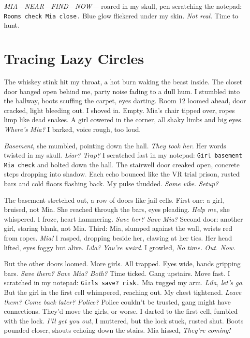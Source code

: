 \documentclass[12pt,oneside]{book}
\newcommand{\note}[1]{\texttt{#1}}
\begin{document}
\textit{MIA—NEAR—FIND—NOW—} roared in my skull, pen scratching the notepad: \note{Rooms check Mia close.} Blue glow flickered under my skin. \textit{Not real.} Time to hunt.

\chapter{Tracing Lazy Circles}

The whiskey stink hit my throat, a hot burn waking the beast inside. The closet door banged open behind me, party noise fading to a dull hum. I stumbled into the hallway, boots scuffing the carpet, eyes darting. Room 12 loomed ahead, door cracked, light bleeding out. I shoved in. Empty. Mia’s chair tipped over, ropes limp like dead snakes. A girl cowered in the corner, all shaky limbs and big eyes. \textit{Where’s Mia?} I barked, voice rough, too loud.

\textit{Basement}, she mumbled, pointing down the hall. \textit{They took her}. Her words twisted in my skull. \textit{Liar? Trap?} I scratched fast in my notepad: \note{Girl basement Mia check} and bolted down the hall. The stairwell door creaked open, concrete steps dropping into shadow. Each echo bounced like the VR trial prison, rusted bars and cold floors flashing back. My pulse thudded. \textit{Same vibe. Setup?}

The basement stretched out, a row of doors like jail cells. First one: a girl, bruised, not Mia. She reached through the bars, eyes pleading. \textit{Help me}, she whispered. I froze, heart hammering. \textit{Save her? Save Mia?} Second door: another girl, staring blank, not Mia. Third: Mia, slumped against the wall, wrists red from ropes. \textit{Mia!} I rasped, dropping beside her, clawing at her ties. Her head lifted, eyes foggy but alive. \textit{Lila? You’re weird}. I growled, \textit{No time. Out. Now.}

But the other doors loomed. More girls. All trapped. Eyes wide, hands gripping bars. \textit{Save them? Save Mia? Both?} Time ticked. Gang upstairs. Move fast. I scratched in my notepad: \note{Girls save? risk.} Mia tugged my arm. \textit{Lila, let’s go}. But the girl in the first cell whimpered, reaching out. My chest tightened. \textit{Leave them? Come back later? Police?} Police couldn’t be trusted, gang might have connections. They’d move the girls, or worse. I darted to the first cell, fumbled with the lock. \textit{I’ll get you out}, I muttered, but the lock stuck, rusted shut. Boots pounded closer, shouts echoing down the stairs. Mia hissed, \textit{They’re coming!}
\end{document}
